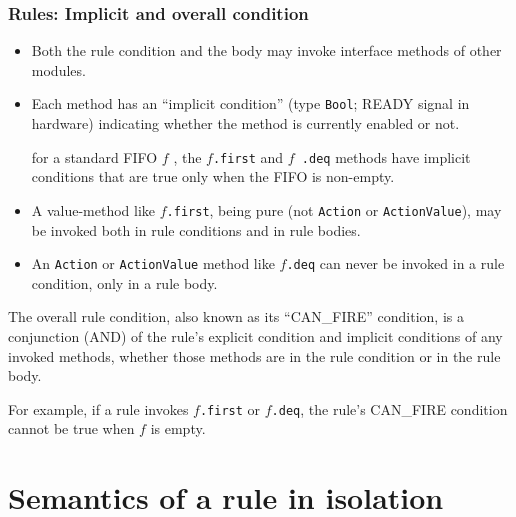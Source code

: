 
\begin{frame}[fragile]
\frametitle{Rules: Implicit and overall condition}

\footnotesize

\begin{itemize}

\item Both the rule condition and the body may invoke interface methods of
      other modules.

\item Each method has an ``implicit condition'' (type {\tt Bool}; READY signal in hardware)
      indicating whether the method is currently enabled or not.

      {\Eg} for a standard FIFO $f$ , the $f${\tt .first} and $f${\tt
      .deq} methods have implicit conditions that are true only when
      the FIFO is non-empty.

\item A value-method like $f${\tt .first}, being
      pure (not {\tt Action} or {\tt ActionValue}), may be invoked
      both in rule conditions and in rule bodies.

\item An {\tt Action} or {\tt ActionValue}  method like $f${\tt .deq} can
      never be invoked in a rule condition, only in a rule body.

\end{itemize}

\vspace{5ex}

The overall rule condition, also known as its ``CAN\_FIRE'' condition,
is a conjunction (AND) of the rule’s explicit condition and implicit
conditions of any invoked methods, whether those methods are in the
rule condition or in the rule body.

\vspace{1ex}

For example, if a rule invokes $f${\tt .first} or $f${\tt .deq}, the
rule’s CAN\_FIRE condition cannot be true when $f$ is empty.

\end{frame}


\section{Semantics of a rule in isolation}

